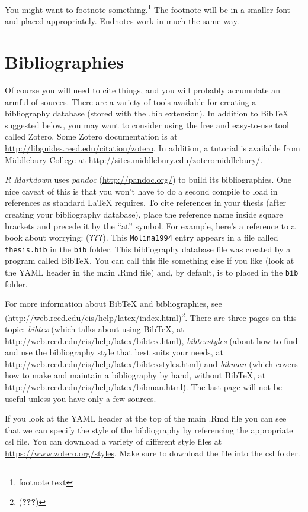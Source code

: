 \documentclass[twoside,12pt,final]{ucthesis-CA2012}
\begin{document}
\begin{ucmainmatter}
You might want to footnote something.\footnote{footnote text} The
footnote will be in a smaller font and placed appropriately. Endnotes
work in much the same way.

\hypertarget{bibliographies}{%
\section{Bibliographies}\label{bibliographies}}

Of course you will need to cite things, and you will probably accumulate
an armful of sources. There are a variety of tools available for
creating a bibliography database (stored with the .bib extension). In
addition to BibTeX suggested below, you may want to consider using the
free and easy-to-use tool called Zotero. Some Zotero documentation is at
\url{http://libguides.reed.edu/citation/zotero}. In addition, a tutorial
is available from Middlebury College at
\url{http://sites.middlebury.edu/zoteromiddlebury/}.

\emph{R Markdown} uses \emph{pandoc} (\url{http://pandoc.org/}) to build
its bibliographies. One nice caveat of this is that you won't have to do
a second compile to load in references as standard LaTeX requires. To
cite references in your thesis (after creating your bibliography
database), place the reference name inside square brackets and precede
it by the ``at'' symbol. For example, here's a reference to a book about
worrying: ({\textbf{???}}). This \texttt{Molina1994} entry appears in a
file called \texttt{thesis.bib} in the \texttt{bib} folder. This
bibliography database file was created by a program called BibTeX. You
can call this file something else if you like (look at the YAML header
in the main .Rmd file) and, by default, is to placed in the \texttt{bib}
folder.

For more information about BibTeX and bibliographies, see
(\url{http://web.reed.edu/cis/help/latex/index.html})\footnote{({\textbf{???}})}.
There are three pages on this topic: \emph{bibtex} (which talks about
using BibTeX, at \url{http://web.reed.edu/cis/help/latex/bibtex.html}),
\emph{bibtexstyles} (about how to find and use the bibliography style
that best suits your needs, at
\url{http://web.reed.edu/cis/help/latex/bibtexstyles.html}) and
\emph{bibman} (which covers how to make and maintain a bibliography by
hand, without BibTeX, at
\url{http://web.reed.edu/cis/help/latex/bibman.html}). The last page
will not be useful unless you have only a few sources.

If you look at the YAML header at the top of the main .Rmd file you can
see that we can specify the style of the bibliography by referencing the
appropriate csl file. You can download a variety of different style
files at \url{https://www.zotero.org/styles}. Make sure to download the
file into the csl folder.


\end{ucmainmatter}
\end{document}
